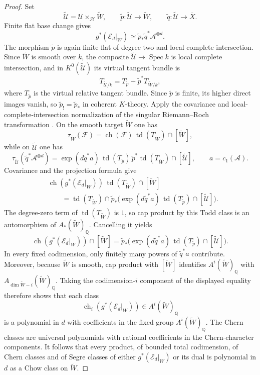 \documentclass{lms}
\DeclareMathOperator{\Spec}{Spec}
\DeclareMathOperator{\ch}{ch}
\DeclareMathOperator{\td}{td}
\newcommand{\Ample}{\mathcal A}
\newcommand{\barX}{\overline{X}}
\begin{document}
\begin{proof}
Set
\[
        \widetilde{\mathcal U}=\mathcal U\times_{\mathcal H}\widetilde W,
        \qquad
        \widetilde p:\widetilde{\mathcal U}\to\widetilde W,
        \qquad
        \widetilde q:\widetilde{\mathcal U}\to\barX .
\]
Finite flat base change gives
\[
        g^*(\mathcal E_d|_W)\simeq \widetilde p_*\widetilde q^*\Ample^{\otimes d}.
\]
The morphism $\widetilde p$ is again finite flat of degree two and local complete intersection.  Since $\widetilde W$ is smooth over $k$, the composite $\widetilde{\mathcal U}\to\Spec k$ is local complete intersection, and in $K^0(\widetilde{\mathcal U})$ its virtual tangent bundle is
\[
        T_{\widetilde{\mathcal U}/k}
        =T_{\widetilde p}+\widetilde p^*T_{\widetilde W/k},
\]
where $T_{\widetilde p}$ is the virtual relative tangent bundle.  Since $\widetilde p$ is finite, its higher direct images vanish, so $\widetilde p_!=\widetilde p_*$ in coherent $K$-theory.  Apply the covariance and local-complete-intersection normalization of the singular Riemann--Roch transformation \cite[Theorem 18.3]{Fulton1998}.  On the smooth target $\widetilde W$ one has
\[
        \tau_{\widetilde W}(\mathcal F)
        =\ch(\mathcal F)\,\td(T_{\widetilde W})\cap[\widetilde W],
\]
while on $\widetilde{\mathcal U}$ one has
\[
        \tau_{\widetilde{\mathcal U}}(\widetilde q^*\Ample^{\otimes d})
        =\exp(d\widetilde q^*a)\,\td(T_{\widetilde p})\,
        \widetilde p^*\td(T_{\widetilde W})\cap[\widetilde{\mathcal U}],
        \qquad a=c_1(\Ample).
\]
Covariance and the projection formula give
\[
\begin{aligned}
        &\ch(g^*(\mathcal E_d|_W))\,\td(T_{\widetilde W})\cap[\widetilde W]\\
        &\qquad=
        \td(T_{\widetilde W})\cap
        \widetilde p_*
        \bigl(\exp(d\widetilde q^*a)\,\td(T_{\widetilde p})\cap[\widetilde{\mathcal U}]\bigr).
\end{aligned}
\]
The degree-zero term of $\td(T_{\widetilde W})$ is $1$, so cap product by this Todd class is an automorphism of $A_*(\widetilde W)_{\mathbb Q}$.  Cancelling it yields
\[
        \ch(g^*(\mathcal E_d|_W))\cap[\widetilde W]
        =
        \widetilde p_*
        \bigl(\exp(d\widetilde q^*a)\,\td(T_{\widetilde p})\cap[\widetilde{\mathcal U}]\bigr).
\]
In every fixed codimension, only finitely many powers of $\widetilde q^*a$ contribute.  Moreover, because $\widetilde W$ is smooth, cap product with $[\widetilde W]$ identifies $A^i(\widetilde W)_{\mathbb Q}$ with $A_{\dim\widetilde W-i}(\widetilde W)_{\mathbb Q}$.  Taking the codimension-$i$ component of the displayed equality therefore shows that each class
\[
        \ch_i(g^*(\mathcal E_d|_W))\in A^i(\widetilde W)_{\mathbb Q}
\]
is a polynomial in $d$ with coefficients in the fixed group $A^i(\widetilde W)_{\mathbb Q}$.  The Chern classes are universal polynomials with rational coefficients in the Chern-character components.  It follows that every product, of bounded total codimension, of Chern classes and of Segre classes of either $g^*(\mathcal E_d|_W)$ or its dual is polynomial in $d$ as a Chow class on $\widetilde W$.


\end{proof}
\end{document}
